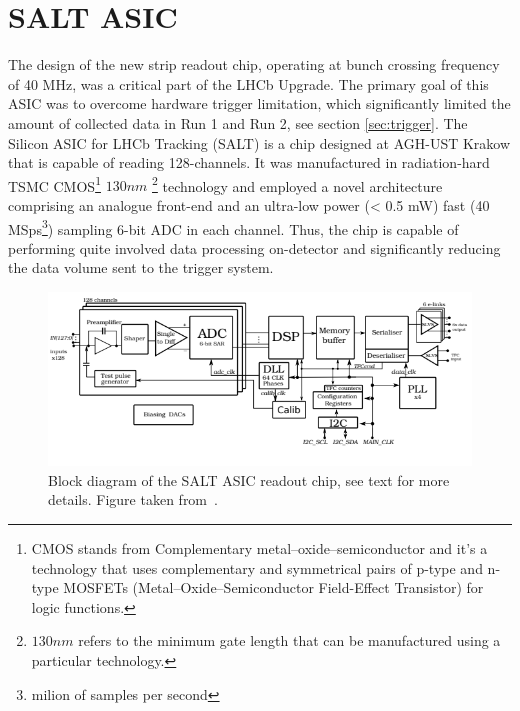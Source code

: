  \section{SALT ASIC}
 \label{sec:salt}
The design of the new strip readout chip, operating at bunch crossing frequency of 40 MHz, was a critical part of the LHCb Upgrade. The primary goal of this ASIC was to overcome hardware trigger limitation, which significantly limited the amount of collected data in Run 1 and Run 2, see section \ref{sec:trigger}. 
The Silicon ASIC for LHCb Tracking (SALT) is a chip designed at AGH-UST Krakow that is capable of reading 128-channels. It was manufactured in radiation-hard TSMC CMOS\footnote{CMOS stands from Complementary metal–oxide–semiconductor and it's a technology that uses complementary and symmetrical pairs of p-type and n-type  MOSFETs (Metal–Oxide–Semiconductor Field-Effect Transistor) for logic functions.} $130 nm$ \footnote{$130 nm$ refers to the minimum gate length that can be manufactured using a particular technology. } technology and employed a novel architecture comprising an analogue front-end and an ultra-low power (< 0.5 mW) fast (40 MSps\footnote{milion of samples per second}) sampling 6-bit ADC in each channel. Thus, the chip is capable of performing quite involved data processing on-detector and significantly reducing the data volume sent to the trigger system.


\begin{figure}[ht!]
\centering
\includegraphics{figures/SALT_2.PNG}
\caption{Block diagram of the SALT ASIC readout chip, see text for more details. Figure taken from~\cite{SALT}.
\label{fig:SALT}}
\end{figure}


